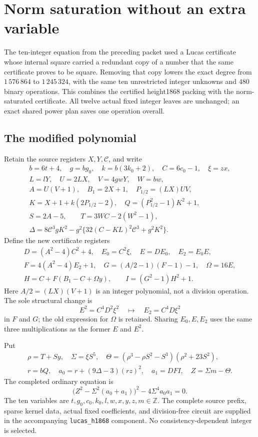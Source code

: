 \section{Norm saturation without an extra variable}

The ten-integer equation from the preceding packet used a Lucas certificate
whose internal square carried a redundant copy of a number that the same
certificate proves to be square. Removing that copy lowers the exact degree
from $1\,576\,864$ to $1\,245\,324$, with the same ten unrestricted
integer unknowns and $480$ binary operations. This combines the certified
height1868 packing with the norm-saturated certificate. All twelve actual
fixed integer leaves are unchanged; an exact shared power plan saves one
operation overall.

\subsection{The modified polynomial}

Retain the source registers $X,Y,\mathscr C$, and write
\[
\begin{gathered}
 b=6t+4,\quad g=bg_0,\quad k=b(3k_0+2),\quad C=6c_0-1,\quad \xi=zx,\\
 L=lY,\quad U=2LX,\quad V=4gwY,\quad W=bw,\\
 A=U(V+1),\quad B_1=2X+1,\quad P_{1/2}=(LX)UV,\\
 K=X+1+k(2P_{1/2}-2),\quad Q=(P_{1/2}^2-1)K^2+1,\\
 S=2A-5,\qquad T=3WC-2(W^2-1),\\
 \Delta=8\mathscr C^3gK^2-g^2\{32(C-KL)^2\mathscr C^3+g^2K^2\}.
\end{gathered}
\]
Define the new certificate registers
\[
\begin{gathered}
 D=(A^2-4)C^2+4,\quad E_0=C^2\xi,\quad E=DE_0,\quad E_2=E_0E,\\
 F=4(A^2-4)E_2+1,\quad G=(A/2-1)(F-1)-1,\quad \Omega=16E,\\
 H=C+F(B_1-C+\Omega y),\qquad I=(G^2-1)H^2+1.
\end{gathered}
\]
Here $A/2=(LX)(V+1)$ is an integer polynomial, not a division operation.
The sole structural change is
\[
 E^2=C^4D^2\xi^2\quad\longmapsto\quad E_2=C^4D\xi^2
\]
in $F$ and $G$; the old expression for $\Omega$ is retained.
Sharing $E_0,E,E_2$ uses the same three multiplications as the former
$E$ and $E^2$.

Put
\[
\begin{gathered}
 \rho=T+Sy,\quad \Sigma=\xi S^5,\quad
 \Theta=(\rho^3-\rho S^2-S^3)(\rho^2+23S^2),\\
 r=bQ,\quad a_0=r+(9\Delta-3)(rz)^2,\quad a_1=DFI,
 \quad Z=\Sigma m-\Theta.
\end{gathered}
\]
The completed ordinary equation is
\begin{equation}\label{eq:norm-saturated-ten}
 \boxed{\bigl(Z^2-\Sigma^2(a_0+a_1)\bigr)^2
          -4\Sigma^4a_0a_1=0.}
\end{equation}
The ten variables are $t,g_0,c_0,k_0,l,w,x,y,z,m\in\mathbb Z$.
The complete source prefix, sparse kernel data, actual fixed coefficients,
and division-free circuit are supplied in the accompanying \texttt{lucas\_h1868}
component. No consistency-dependent integer is selected.

